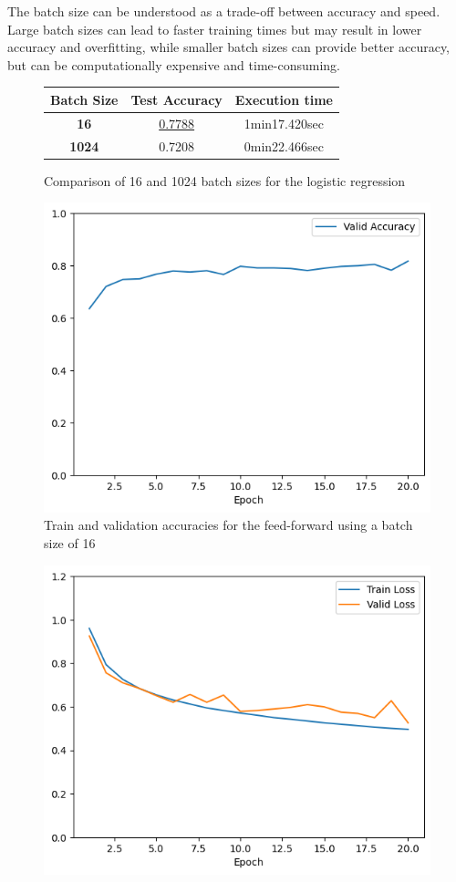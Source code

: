 \documentclass[12pt]{article}
\begin{document}
\begin{itemize}
          The batch size can be understood as a trade-off between accuracy and speed. Large batch sizes can lead to faster training times but may result in lower accuracy and overfitting, while smaller batch sizes can provide better accuracy, but can be computationally expensive and time-consuming.
          \begin{figure}[H]
              \centering
              \begin{tabular}{|c|cc|}
                  \toprule
                  \textbf{Batch Size} & \textbf{Test Accuracy} & \textbf{Execution time} \\
                  \midrule
                  \textbf{16}         & \underline{0.7788}                 & 1min17.420sec        \\
                  \textbf{1024}       & 0.7208                 & 0min22.466sec        \\
                  \bottomrule
              \end{tabular}
              \caption{Comparison of 16 and 1024 batch sizes for the logistic regression}
              \label{tab:2.2a}
          \end{figure}
          \begin{figure}[H]
              \centering
              \includegraphics[width=0.5\linewidth]{../outputs/hw1-q2-2a-acc-16.png}
              \caption{Train and validation accuracies for the feed-forward using a batch size of 16}
              \label{fig:2.2a:acc:16}
          \end{figure}
          \begin{figure}[H]
              \centering
              \includegraphics[width=0.5\linewidth]{../outputs/hw1-q2-2a-loss-16.png}

\end{figure}
\end{itemize}
\end{document}
